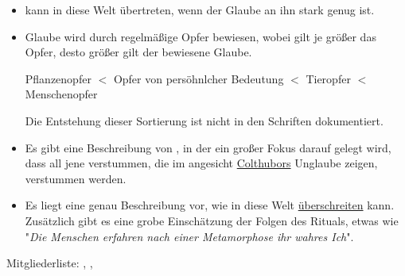        \begin{itemize}
            \item {} kann in diese Welt übertreten, wenn der Glaube an ihn stark genug ist.
            \item Glaube wird durch regelmäßige Opfer bewiesen, wobei gilt je größer das Opfer, desto größer gilt der bewiesene Glaube.
                \begin{displayquote}
                    Pflanzenopfer $<$ Opfer von persöhnlcher Bedeutung $<$ Tieropfer $<$ Menschenopfer
                \end{displayquote}
                Die Entstehung dieser Sortierung ist nicht in den Schriften dokumentiert.
            \item Es gibt eine Beschreibung von , in der ein großer Fokus darauf gelegt wird, dass all jene verstummen, die im angesicht \hyperref[pers:colthubor]{Colthubors} Unglaube zeigen, verstummen werden.
            \item Es liegt eine genau Beschreibung vor, wie  in diese Welt \hyperref[sons:kult-von-colthubor]{überschreiten} kann. Zusätzlich gibt es eine grobe Einschätzung der Folgen des Rituals, etwas wie "\emph{Die Menschen erfahren nach einer Metamorphose ihr wahres Ich}".
        \end{itemize}

    Mitgliederliste: , , 
